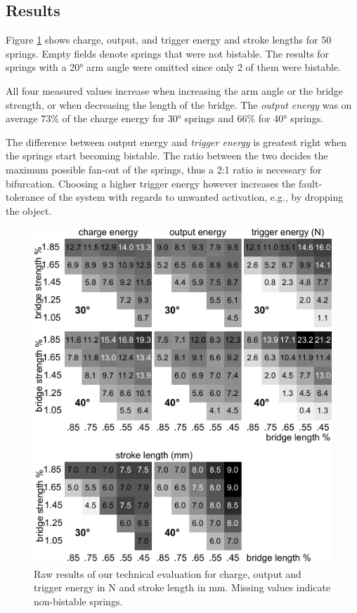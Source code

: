 \subsection{Results}

Figure \ref{fig:26-results} shows charge, output, and trigger energy and stroke lengths for 50 springs. Empty fields denote springs that were not bistable. The results for springs with a 20° arm angle were omitted since only 2 of them were bistable. 

All four measured values increase when increasing the arm angle or the bridge strength, or when decreasing the length of the bridge. The \textit{output energy} was on average 73\% of the charge energy for 30° springs and 66\% for 40° springs. 

The difference between output energy and \textit{trigger energy} is greatest right when the springs start becoming bistable. The ratio between the two decides the maximum possible fan-out of the springs, thus a 2:1 ratio is necessary for bifurcation. Choosing a higher trigger energy however increases the fault-tolerance of the system with regards to unwanted activation, e.g., by dropping the object. 

\begin{figure} [!h]  
    \centering
    \includegraphics[width=\textwidth]{chapters/digital-metamaterials-FIG/26-results.pdf}
    \caption[Short figure name.]{Raw results of our technical evaluation for charge, output and trigger energy in $\mathrm{N}$ and stroke length in $\mathrm{mm}$. Missing values indicate non-bistable springs.
    \label{fig:26-results}}
\end{figure}

